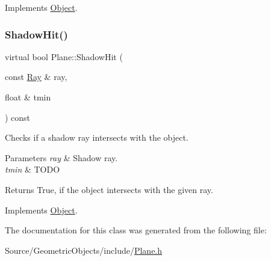 Implements \hyperlink{class_object_ad9977e40c0a3048eba9a81b25efcf3ef}{Object}.

\hypertarget{class_plane_a21f6adf1c2be7853a61e1f8d811b76eb}{}\label{class_plane_a21f6adf1c2be7853a61e1f8d811b76eb} 
\subsubsection{\texorpdfstring{Shadow\+Hit()}{ShadowHit()}}
{\footnotesize\ttfamily virtual bool Plane\+::\+Shadow\+Hit (\begin{DoxyParamCaption}\item[{const \hyperlink{class_ray}{Ray} \&}]{ray,  }\item[{float \&}]{tmin }\end{DoxyParamCaption}) const\hspace{0.3cm}{\ttfamily [pure virtual]}}

Checks if a shadow ray intersects with the object. 
\begin{DoxyParams}{Parameters}
{\em ray} & Shadow ray. \\
\hline
{\em tmin} & T\+O\+DO \\
\hline
\end{DoxyParams}
\begin{DoxyReturn}{Returns}
True, if the object intersects with the given ray. 
\end{DoxyReturn}


Implements \hyperlink{class_object_a020a6edbef7b2591b1dd6815ebbc5aa0}{Object}.



The documentation for this class was generated from the following file\+:\begin{DoxyCompactItemize}
\item 
Source/\+Geometric\+Objects/include/\hyperlink{_plane_8h}{Plane.\+h}\end{DoxyCompactItemize}

